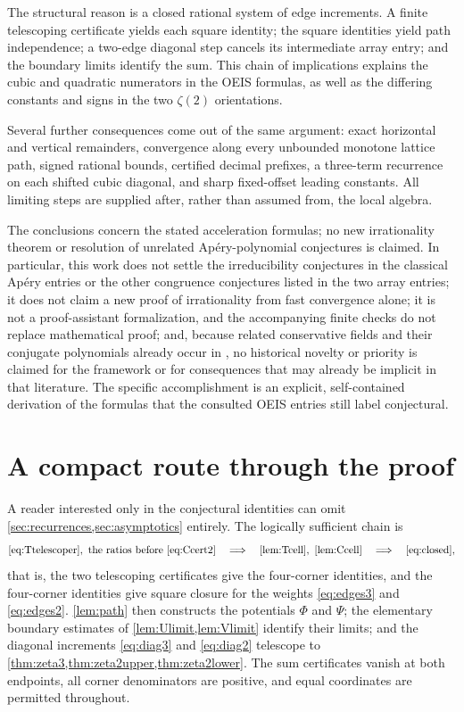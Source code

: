 \documentclass[11pt,letterpaper]{article}
\numberwithin{equation}{section}
\theoremstyle{definition}
\begin{document}
The structural reason is a closed rational system of edge increments.
A finite telescoping certificate yields each square identity; the square
identities yield path independence; a two-edge diagonal step cancels its
intermediate array entry; and the boundary limits identify the sum.
This chain of implications explains the cubic and quadratic numerators
in the OEIS formulas, as well as the differing constants and signs in
the two $\zeta(2)$ orientations.

Several further consequences come out of the same argument: exact
horizontal and vertical remainders, convergence along every unbounded
monotone lattice path, signed rational bounds, certified decimal
prefixes, a three-term recurrence on each shifted cubic diagonal, and
sharp fixed-offset leading constants. All limiting steps are supplied
after, rather than assumed from, the local algebra.

The conclusions concern the stated acceleration formulas; no new
irrationality theorem or resolution of unrelated Ap\'ery-polynomial
conjectures is claimed. In particular, this work does not settle the
irreducibility conjectures in the classical Ap\'ery entries or the other
congruence conjectures listed in the two array entries; it does not claim
a new proof of irrationality from fast convergence alone; it is not a
proof-assistant formalization, and the accompanying finite checks do not
replace mathematical proof; and, because related conservative fields and
their conjugate polynomials already occur in \cite{david}, no historical
novelty or priority is claimed for the framework or for consequences that
may already be implicit in that literature. The specific accomplishment
is an explicit, self-contained derivation of the formulas that the
consulted OEIS entries still label conjectural.

\clearpage
\appendix
\section{A compact route through the proof}\label{app:compact}

A reader interested only in the conjectural identities can omit
\cref{sec:recurrences,sec:asymptotics} entirely. The logically sufficient
chain is
\[
 \eqref{eq:Ttelescoper},\ \hbox{the ratios before }\eqref{eq:Ccert2}
 \quad\Longrightarrow\quad
 \hbox{\cref{lem:Tcell}},\ \hbox{\cref{lem:Ccell}}
 \quad\Longrightarrow\quad
 \eqref{eq:closed},
\]
that is, the two telescoping certificates give the four-corner
identities, and the four-corner identities give square closure for the
weights \eqref{eq:edges3} and \eqref{eq:edges2}. \cref{lem:path} then
constructs the potentials $\Phi$ and $\Psi$; the elementary boundary
estimates of \cref{lem:Ulimit,lem:Vlimit} identify their limits; and the
diagonal increments \eqref{eq:diag3} and \eqref{eq:diag2} telescope to
\cref{thm:zeta3,thm:zeta2upper,thm:zeta2lower}. The sum certificates
vanish at both endpoints, all corner denominators are positive, and equal
coordinates are permitted throughout.
\end{document}
